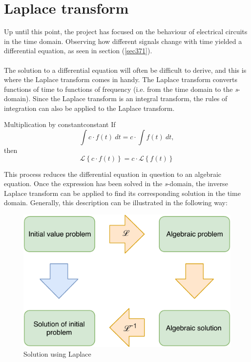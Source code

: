 \chapter{Laplace transform}
Up until this point, the project has focused on the behaviour of electrical circuits in the time domain. Observing how different signals change with time yielded a differential equation, as seen in section (\ref{sec371}).
\\ \\
The solution to a differential equation will often be difficult to derive, and this is where the Laplace transform comes in handy. The Laplace transform converts functions of time to functions of frequency (i.e. from the time domain to the \textit{s}-domain). Since the Laplace transform is an integral transform, the rules of integration can also be applied to the Laplace transform.
\begin{definition}{Multiplication by constant}{constant}
If $$ \int c \cdot f(t) \ dt = c \cdot \int f(t) \ dt,$$
then $$\mathcal{L} \left\{c \cdot f(t) \right\} = c \cdot \mathcal{L} \left\{f(t) \right\}$$
\end{definition}
This process reduces the differential equation in question to an algebraic equation. Once the expression has been solved in the \textit{s}-domain, the inverse Laplace transform can be applied to find its corresponding solution in the time domain. Generally, this description can be illustrated in the following way:
\begin{figure}[H]
\center
\includegraphics[scale=1]{fig/img/laplace_circ.pdf}
\caption{Solution using Laplace}
\label{lpsol}
\end{figure}

